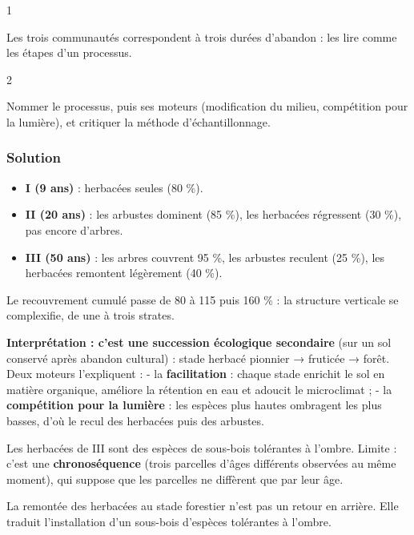 \documentclass[11pt,a4paper]{article}
\providecommand{\tightlist}{\setlength{\itemsep}{0pt}\setlength{\parskip}{0pt}}
\begin{document}
\begin{indication}{1}

Les trois communautés correspondent à trois durées d'abandon : les lire comme les étapes d'un processus.

\end{indication}

\begin{indication}{2}

Nommer le processus, puis ses moteurs (modification du milieu, compétition pour la lumière), et critiquer la méthode d'échantillonnage.

\end{indication}

\hypertarget{solution-28}{%
\subsubsection{Solution}\label{solution-28}}

\begin{itemize}
\tightlist
\item
  \textbf{I (9 ans)} : herbacées seules (80 \%).
\item
  \textbf{II (20 ans)} : les arbustes dominent (85 \%), les herbacées régressent (30 \%), pas encore d'arbres.
\item
  \textbf{III (50 ans)} : les arbres couvrent 95 \%, les arbustes reculent (25 \%), les herbacées remontent légèrement (40 \%).
\end{itemize}

Le recouvrement cumulé passe de 80 à 115 puis 160 \% : la structure verticale se complexifie, de une à trois strates.

\textbf{Interprétation : c'est une succession écologique secondaire} (sur un sol conservé après abandon cultural) : stade herbacé pionnier → fruticée → forêt. Deux moteurs l'expliquent :
- la \textbf{facilitation} : chaque stade enrichit le sol en matière organique, améliore la rétention en eau et adoucit le microclimat ;
- la \textbf{compétition pour la lumière} : les espèces plus hautes ombragent les plus basses, d'où le recul des herbacées puis des arbustes.

Les herbacées de III sont des espèces de sous-bois tolérantes à l'ombre. Limite : c'est une \textbf{chronoséquence} (trois parcelles d'âges différents observées au même moment), qui suppose que les parcelles ne diffèrent que par leur âge.

\begin{piege}

La remontée des herbacées au stade forestier n'est pas un retour en arrière. Elle traduit l'installation d'un sous-bois d'espèces tolérantes à l'ombre.

\end{piege}
\end{document}
